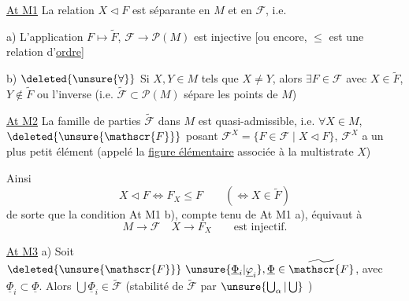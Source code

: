 

\uline{At M1} La relation $X\triangleleft F$ est séparante en $M$ et en $\mathscr{F}$, i.e.

a) L'application $F\longmapsto\widetilde{F}$, $\mathscr{F}\longrightarrow\mathscr{P}(M)$ est injective [ou encore, $\leq$ est une relation d'\uline{ordre}]

b) $\deleted{\unsure{\forall}}$ Si $X,Y\in M$ tels que $X\neq Y$, alors $\exists F\in\mathscr{F}$ avec $X\in\widetilde{F}$, $Y\notin\widetilde{F}$ ou l'inverse (i.e. $\widetilde{\mathscr{F}}\subset\mathscr{P}(M)$ sépare les points de $M$)

\uline{At M2} La famille de parties $\widetilde{\mathscr{F}}$ dans $M$ est quasi-admissible, i.e. $\forall X\in M$, $\deleted{\unsure{\mathscr{F}}}$ posant $\mathscr{F}^{X}=\{F\in\mathscr{F}\mid X\triangleleft F\}$, $\mathscr{F}^{X}$ a un plus petit élément (appelé la \uline{figure élémentaire} associée à la multistrate $X$)

Ainsi 
\[
X\triangleleft F\Longleftrightarrow F_X\leq F\qquad(\Longleftrightarrow X\in\widetilde{F})
\]
de sorte que la condition At M1 b), compte tenu de At M1 a), équivaut à
\[
M\longrightarrow\mathscr{F}\quad X\longrightarrow F_X\qquad\text{est injectif}.
\]

\uline{At M3} a) Soit $\deleted{\unsure{\mathscr{F}}}\ \unsure{\underline{\Phi}_i|\underline{\varphi}_i},\underline{\Phi}\in\widetilde{\mathscr{F}}$, avec $\underline{\Phi}_i\subset\underline{\Phi}$. Alors $\bigcup\underline{\Phi}_i\in\widetilde{\mathscr{F}}$ (stabilité de $\widetilde{\mathscr{F}}$ par $\unsure{\bigcup_{\alpha}|\bigcup}$ )

